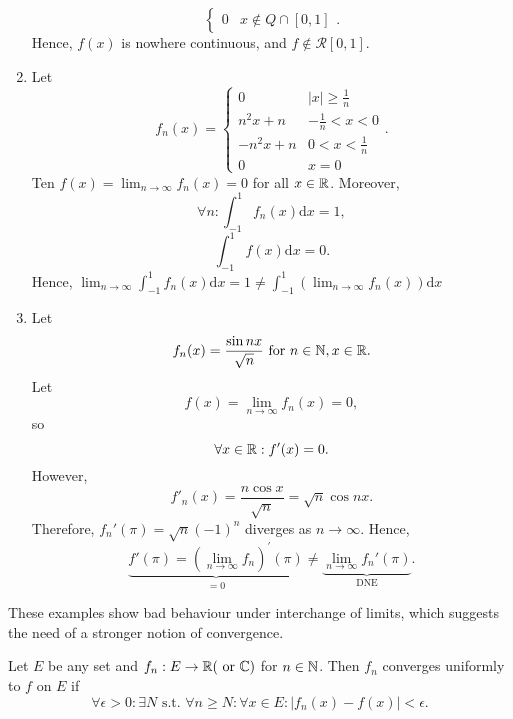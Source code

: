 \begin{example}
\begin{enumerate}[label=(\arabic*)]
\[\begin{cases}
				      0 & x \notin Q \cap [0,1]
			      \end{cases}
			      .\]
		      Hence, $f(x)$ is nowhere continuous, and $f \notin \mathscr{R}[0,1]$.
		\item
		      Let \[
			      f_n(x)= \begin{cases}
				      0       & \left|x\right|\ge \frac{1}{n} \\
				      n^2x +n & -\frac{1}{n}<x<0              \\
				      -n^2x+n & 0<x<\frac{1}{n}               \\
				      0       & x=0
			      \end{cases}
			      .\]
		      Ten $f(x)=\lim_{n\to \infty}{f_n(x)}=0$ for all $x \in \mathbb{R}$.
		      Moreover,
		      \[
			      \forall{n}: \int_{-1}^{1}{f_n(x)\mathrm{d}x}=1
			      ,\]
		      \[
			      \int_{-1}^{1}{f(x)\mathrm{d}x}=0
			      .\]
		      Hence, $\lim_{n\to \infty}{\int_{-1}^{1}{f_n(x)\mathrm{d}x}}=1\neq  \int_{-1}^{1}{\left(\lim_{n\to \infty}{f_n(x)}\right) \mathrm{d}x}$
		\item Let \[
			      f_n(x)=\frac{\sin{nx}}{\sqrt{n}} \text{ for }  n \in \mathbb{N}, x \in \mathbb{R}
			      .\]
		      Let
		      \[
			      f(x)=\lim_{n\to \infty}{f_n(x)}=0
			      ,\]
		      so
		      \[
			      \forall{x \in \ensuremath{\mathbb{R}}}: f'(x)=0
			      .\]
		      However, \[
			      f'_n(x)= \frac{n \cos{x}}{\sqrt{n}}=\sqrt{n} \cos{nx}
			      .\]
		      Therefore, $f_{n}'(\pi)=\sqrt{n}(-1)^{n}$ diverges as $n\to \infty$. Hence,
		      \[
			      \underbrace{f'(\pi)=\left(\lim_{n\to \infty}{f_n}\right)^{'}(\pi)}_{=0}\neq \underbrace{\lim_{n\to \infty}{f_n'(\pi)}}_{\text{DNE}}
			      .\]
	\end{enumerate}
	These examples show bad behaviour under interchange of limits, which suggests the need of a stronger notion of convergence.
\end{example}

\begin{define}[7]
	Let $E$ be any set and $f_n: E\to \mathbb{R} (\text{ or } \mathbb{C}) $ for $n \in \mathbb{N}$. Then $f_{n}$ converges uniformly to $f$ on $E$ if \[
		\forall{\epsilon>0}: \exists{N} \text{ s.t. } \forall{n\ge N}: \forall{x \in E}: \left|f_{n}(x)-f(x)\right|<\epsilon
		.\]
\end{define}

